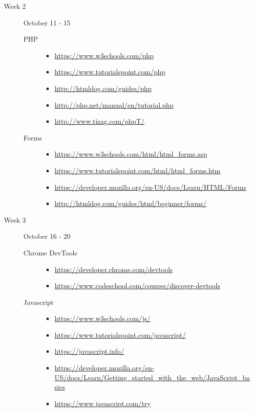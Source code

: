 \documentclass{article}
\begin{document}
\begin{description}
\item[Week 2] October 11 - 15
  \begin{description}
\item[PHP]\mbox{}
  \begin{itemize}
  \item\scriptsize\url{https://www.w3schools.com/php}
  \item\scriptsize\url{https://www.tutorialspoint.com/php}
  \item\scriptsize\url{http://htmldog.com/guides/php}
  \item\scriptsize\url{http://php.net/manual/en/tutorial.php}
  \item\scriptsize\url{http://www.tizag.com/phpT/}
  \end{itemize}

\item[Forms]\mbox{}
  \begin{itemize}
  \item\scriptsize\url{https://www.w3schools.com/html/html_forms.asp}
  \item\scriptsize\url{https://www.tutorialspoint.com/html/html_forms.htm}
  \item\scriptsize\url{https://developer.mozilla.org/en-US/docs/Learn/HTML/Forms}
  \item\scriptsize\url{http://htmldog.com/guides/html/beginner/forms/}
  \end{itemize}
  \end{description}


\item[Week 3] October 16 - 20
  \begin{description}
\item[Chrome DevTools]\mbox{}
  \begin{itemize}
  \item\scriptsize\url{https://developer.chrome.com/devtools}
  \item\scriptsize\url{https://www.codeschool.com/courses/discover-devtools}
  \end{itemize}

\item[Javascript]\mbox{}
  \begin{itemize}
  \item\scriptsize\url{https://www.w3schools.com/js/}
  \item\scriptsize\url{https://www.tutorialspoint.com/javascript/}
  \item\scriptsize\url{https://javascript.info/}
  \item\scriptsize\url{https://developer.mozilla.org/en-US/docs/Learn/Getting_started_with_the_web/JavaScript_basics}
  \item\scriptsize\url{https://www.javascript.com/try}
  \end{itemize}


\end{description}
\end{description}
\end{document}
